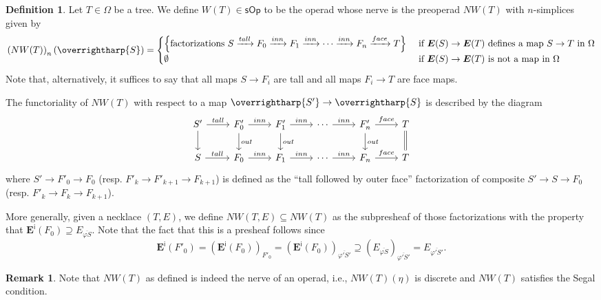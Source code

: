 \documentclass[a4paper,10pt
,draft
]{article}%
\numberwithin{equation}{section}
\numberwithin{figure}{section}
\theoremstyle{definition} %
\newtheorem{definition}[equation]{Definition}%
\newtheorem{remark}[equation]{Remark}%
\newcommand{\vect}[1]{\text{\overrightharp{\ensuremath{#1}}}}
\newcommand{\1}{\ensuremath{\mathbbm 1}}%
\begin{document}
\begin{definition}\label{NWTNS DEF}
	Let $T \in \Omega$ be a tree.
	We define 
	$W(T) \in \mathsf{sOp}$
	to be the operad whose nerve is the preoperad
	$NW(T)$ with $n$-simplices given by
\[
	\left(NW(T)\right)_n(\vect{S})
=
\begin{cases}
	\left\{
	\text{factorizations }
	S \xrightarrow{tall} 
	F_0 \xrightarrow{inn} 
	F_1 \xrightarrow{inn} 
	\cdots \xrightarrow{inn}
	F_n \xrightarrow{face}
	T
	\right\}
&
	\text{ if } 
	\boldsymbol{E}(S) \to \boldsymbol{E}(T)
	\text{ defines a map } S \to T \text{ in } \Omega
\\
	\emptyset 
& \text{ if } 
	\boldsymbol{E}(S) \to \boldsymbol{E}(T)
	\text{ is not a map in } \Omega
\end{cases}
\]
Note that, alternatively, it suffices to say that all maps
$S \to F_i$ are tall
and all maps $F_i \to T$ are face maps.

The functoriality of 
$NW(T)$
with respect to a map $\vect{S'} \to \vect{S}$
is described by the diagram
\[
\begin{tikzcd}
	S' \ar{r}{tall} \ar{d}
&
	F'_0 \ar{r}{inn} \ar{d}{out}
&
	F'_1 \ar{r}{inn} \ar{d}{out}
&
	\cdots \ar{r}{inn}
&
	F'_n \ar{r}{face} \ar{d}{out}
&
	T \ar[equal]{d}
\\
	S \ar{r}{tall} 
&
	F_0 \ar{r}{inn}
&
	F_1 \ar{r}{inn}
&
	\cdots \ar{r}{inn}
&
	F_n \ar{r}{face}
&
	T	
\end{tikzcd}
\]
where 
$S' \to F'_0 \to F_0$
(resp. $F'_k \to F'_{k+1} \to F_{k+1}$)
is defined as the ``tall followed by outer face''
factorization of composite
$S' \to S \to F_0$
(resp. $F'_k \to F_{k} \to F_{k+1}$).


More generally, 
given a necklace $(T,E)$,
we define
$NW(T,E) \subseteq NW(T)$
as the subpresheaf
of those factorizations with the property that
$\boldsymbol{E}^{\mathsf{i}}(F_0) \supseteq E_{\overline{\varphi S}}$.
Note that the fact that this is a presheaf follows 
since
\[
\boldsymbol{E}^{\mathsf{i}}(F'_0)
	=
\left(\boldsymbol{E}^{\mathsf{i}}(F_0)\right)_{F'_0}
	=
\left(\boldsymbol{E}^{\mathsf{i}}(F_0)\right)_{\overline{\varphi' S'}}
	\supseteq 
\left(E_{\overline{\varphi S}}\right)_{\overline{\varphi' S'}}
	= 
E_{\overline{\varphi' S'}}.
\]
\end{definition}



\begin{remark}
	Note that 
	$NW(T)$ as defined is indeed the nerve of an operad, i.e., 
	$NW(T)(\eta)$ is discrete
	and
	$NW(T)$ satisfies the Segal condition.
\end{remark}
\end{document}
